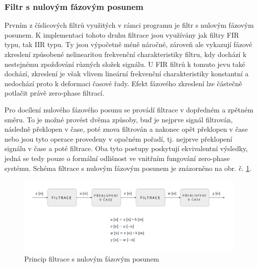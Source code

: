 \documentclass[a4paper, 12pt]{article}
\begin{document}
\subsubsection{Filtr s nulovým fázovým posunem}
\label{sec:filtr1}
Prvním z číslicových filtrů využitých v rámci programu je filtr s nulovým fázovým posunem. K implementaci tohoto druhu filtrace jsou využívány jak filtry FIR typu, tak IIR typu. Ty jsou výpočetně méně náročné, zároveň ale vykazují fázové zkreslení způsobené nelinearitou frekvenční charakteristiky filtru, kdy dochází k nestejnému zpožďování různých složek signálu. U FIR filtrů k tomuto jevu také dochází, zkreslení je však vlivem lineární frekvenční charakteristiky konstantní a nedochází proto k deformaci časové řady. Efekt fázového zkreslení lze částečně potlačit právě zero-phase filtrací. 

Pro docílení nulového fázového posunu se provádí filtrace v dopředném a zpětném směru. To je možné provést dvěma způsoby, buď je nejprve signál filtrován, následně překlopen v čase, poté znova filtrován a nakonec opět překlopen v čase nebo jsou tyto operace provedeny v opačném pořadí, tj. nejprve překlopení signálu v čase a poté filtrace. Oba tyto postupy poskytují ekvivalentní výsledky, jedná se tedy pouze o formální odlišnost ve vnitřním fungování zero-phase systému. Schéma filtrace s nulovým fázovým posunem je znázorněno na obr. č. \ref{fig:zerophase}.
\begin{figure}[hbt!]
  \centering
  \includegraphics[width=\linewidth]{zero-phase_moje.png}
  \caption{Princip filtrace s nulovým fázovým posunem}
  \label{fig:zerophase}
\end{figure}
\end{document}
